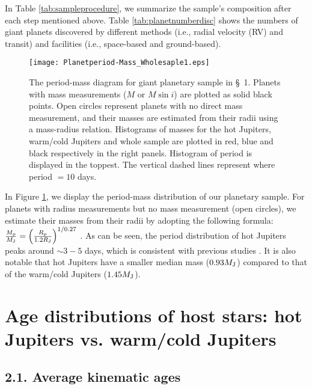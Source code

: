 \documentclass[twocolumn]{pnas-new}
\begin{document}
In Table \ref{tab:sampleprocedure}, we summarize the sample's composition after each step mentioned above.
Table \ref{tab:planetnumberdisc} shows the numbers of giant planets discovered by different methods (i.e., radial velocity (RV) and transit) and facilities (i.e., space-based and ground-based).

\begin{figure}[!t]
\centering
\texttt{[image: Planetperiod-Mass\_Wholesaple1.eps]}
\caption{The period-mass diagram for giant planetary sample in \S~1. 
Planets with mass measurements ($M$ or $M \sin i$) are plotted as solid black points.
{Open circles represent planets with no direct mass measurement, and their masses are estimated from their radii using a mass-radius relation.}
Histograms of masses for the hot Jupiters, warm/cold Jupiters and whole sample are plotted in red, blue and black respectively in the right panels.
Histogram of period is displayed in the toppest.
The vertical dashed lines represent where period $= 10$ days.
\label{figPMplanetsample}}
\end{figure}

In Figure \ref{figPMplanetsample}, we display the period-mass distribution of our planetary sample. 
For planets with radius measurements but no mass measurement (open circles), we estimate their masses from their radii by adopting the following formula: $\frac{M_{\rm p}}{M_{\rm J}} = \left( \frac{R_{\rm p}}{1.2 R_{\rm J}} \right)^{1/0.27}$ \citep{2016A&A...589A..75M}. 
As can be seen, the period distribution of hot Jupiters peaks around
$\sim 3-5$ days, which is consistent with previous studies \citep[e.g.,][]{2016A&A...587A..64S}.
It is also notable that hot Jupiters have a smaller median mass ($0.93 M_{\rm J}$) compared to that of the warm/cold Jupiters ($1.45 M_{\rm J}$). 

\section{Age distributions of host stars: hot Jupiters vs. warm/cold Jupiters}
\label{sec.obs.agedis}

\subsection*{2.1. Average kinematic ages}
\label{sec.obs.kineage}
\end{document}
